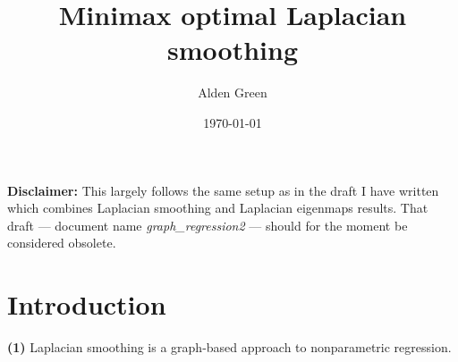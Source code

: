 \documentclass{article}
\newcommand{\1}{\mathbf{1}}
\theoremstyle{alden}
\theoremstyle{aldenthm}
\theoremstyle{definition}
\theoremstyle{remark}
\begin{document}
\title{Minimax optimal Laplacian smoothing}
\author{Alden Green}
\date{\today}
\maketitle

\textbf{Disclaimer:} This largely follows the same setup as in the draft I have written which combines Laplacian smoothing and Laplacian eigenmaps results. That draft --- document name \textit{graph\_regression2} --- should for the moment be considered obsolete.

\section{Introduction}

\textbf{(1)} Laplacian smoothing is a graph-based approach to nonparametric regression. 
\end{document}
